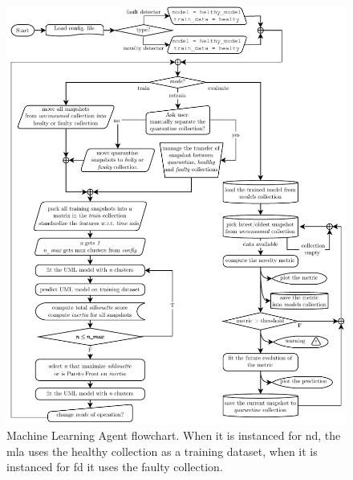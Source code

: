 \begin{figure}
    \centering
    \includegraphics[width=\textwidth]{images/Framework/MLA.pdf}
    \caption{Machine Learning Agent flowchart. When it is instanced for \gls{nd}, the \gls{mla} uses the healthy collection as a training dataset, when it is instanced for \gls{fd} it uses the faulty collection.}
    \label{fig:MLA_structure}
\end{figure}


